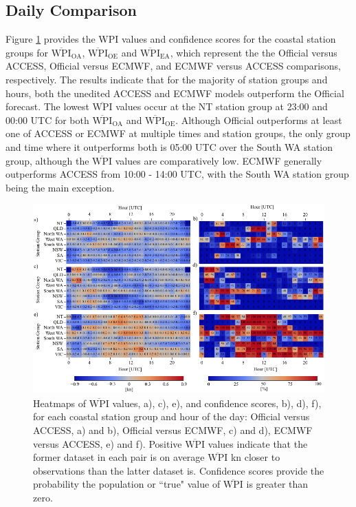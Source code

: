 \documentclass[twocol]{ametsoc}
\begin{document}
\subsection{Daily Comparison}
\label{Sec:Daily}
Figure \ref{Fig:wpi_coastal} provides the WPI values and confidence scores for the coastal station groups for $\overline{\text{WPI}}_\text{OA}$, $\overline{\text{WPI}}_\text{OE}$ and $\overline{\text{WPI}}_\text{EA}$, which represent the the Official versus ACCESS, Official versus ECMWF, and ECMWF versus ACCESS comparisons, respectively. The results indicate that for the majority of station groups and hours, both the unedited ACCESS and ECMWF models outperform the Official forecast. The lowest $\overline{\text{WPI}}$ values occur at the NT station group at 23:00 and 00:00 UTC for both $\overline{\text{WPI}}_\text{OA}$ and $\overline{\text{WPI}}_\text{OE}$. Although Official outperforms at least one of ACCESS or ECMWF at multiple times and station groups, the only group and time where it outperforms both is 05:00 UTC over the South WA station group, although the $\overline{\text{WPI}}$ values are comparatively low. ECMWF generally outperforms ACCESS from 10:00 - 14:00 UTC, with the South WA station group being the main exception.    

\begin{figure}
\centering
\includegraphics[width=39pc]{wpi_coastal.pdf}
\caption{Heatmaps of $\overline{\text{WPI}}$ values, a), c), e), and confidence scores, b), d), f), for each coastal station group and hour of the day: Official versus ACCESS, a) and b), Official versus ECMWF, c) and d), ECMWF versus ACCESS, e) and f). Positive $\overline{\text{WPI}}$ values indicate that the former dataset in each pair is on average $\overline{\text{WPI}}$ kn closer to observations than the latter dataset is. Confidence scores provide the probability the population or ``true" value of $\overline{\text{WPI}}$ is greater than zero.}
\label{Fig:wpi_coastal}
\end{figure}
\end{document}
